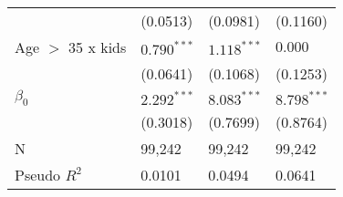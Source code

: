 \begin{tabular}{llll}
                       &           (0.0513) &           (0.0981) &           (0.1160) \\
Age $>$ 35 x kids      &      $0.790^{***}$ &      $1.118^{***}$ &            $0.000$ \\
                       &           (0.0641) &           (0.1068) &           (0.1253) \\
$\beta_0$              &      $2.292^{***}$ &      $8.083^{***}$ &      $8.798^{***}$ \\
                       &           (0.3018) &           (0.7699) &           (0.8764) \\
N                      &             99,242 &             99,242 &             99,242 \\
Pseudo $R^2$           &             0.0101 &             0.0494 &             0.0641 \\
\bottomrule
\end{tabular}
